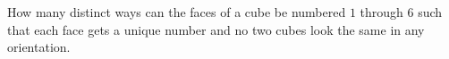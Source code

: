 
%
%
%
%
% 
% 

\question How many distinct ways can the faces of a cube be numbered $1$ through $6$ such that each face gets a unique number and no two cubes look the same in any orientation.

\insertQR{}

\ifprintanswers
\fi 

